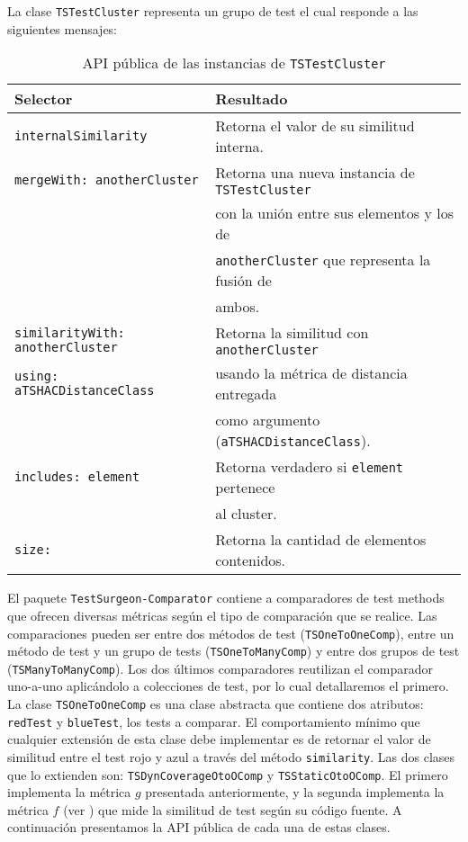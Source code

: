 \par La clase {\tt TSTestCluster} representa un grupo de test el cual responde a las siguientes mensajes: 

\begin{table}[h] 
    \centering 
    \begin{tabular}{|l|l|}
    	\hline
\textbf{Selector} & \textbf{Resultado} \\ \hline \hline

{\tt internalSimilarity } & Retorna el valor de su similitud interna.\\ \hline
{\tt mergeWith: anotherCluster} & Retorna una nueva instancia de {\tt TSTestCluster} \\ 
						& con la unión entre sus elementos y los de  \\ 
						& {\tt anotherCluster} que representa la fusión de \\
						& ambos. \\ \hline
{\tt similarityWith: anotherCluster}	& Retorna la similitud con {\tt anotherCluster} \\ 
{\tt using: aTSHACDistanceClass } &  usando la métrica de distancia entregada  \\
						& como argumento ({\tt aTSHACDistanceClass}).\\ \hline
{\tt includes: element} & Retorna verdadero si {\tt element} pertenece \\
						&  al cluster.\\ \hline
{\tt size:} & Retorna la cantidad de elementos contenidos. \\ \hline		
				
    \end{tabular}
    \caption{API pública de las instancias de {\tt TSTestCluster}}
\end{table}  

\vspace*{1cm}

\par El paquete {\tt TestSurgeon-Comparator} contiene a comparadores de test methods que ofrecen diversas métricas según el tipo de comparación que se realice. Las comparaciones pueden ser entre dos métodos de test ({\tt TSOneToOneComp}), entre un método de test y un grupo de tests ({\tt TSOneToManyComp}) y entre dos grupos de test ({\tt TSManyToManyComp}). Los dos últimos comparadores reutilizan el comparador uno-a-uno aplicándolo a colecciones de test, por lo cual detallaremos el primero. La clase {\tt TSOneToOneComp} es una clase abstracta que contiene dos atributos: {\tt redTest} y {\tt blueTest}, los tests a comparar. El comportamiento mínimo que cualquier extensión de esta clase debe implementar es de retornar el valor de similitud entre el test rojo y azul a través del método {\tt similarity}. Las dos clases que lo extienden son: {\tt TSDynCoverageOtoOComp} y {\tt TSStaticOtoOComp}. El primero implementa la métrica $g$ presentada anteriormente, y la segunda implementa la métrica $f$ (ver ) que mide la similitud de test según su código fuente. A continuación presentamos la API pública de cada una de estas clases.



